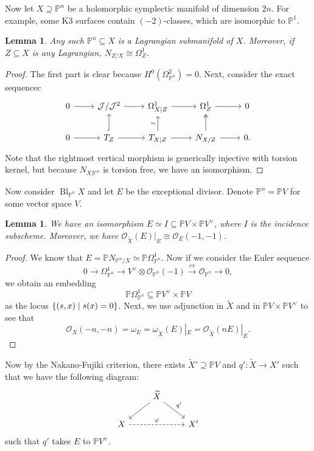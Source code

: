 \documentclass[leqno, openany]{memoir}
\newtheorem{lem}[thm]{Lemma}
\theoremstyle{definition}
\theoremstyle{remark}
\theoremstyle{plain}
\theoremstyle{definition}
\theoremstyle{remark}
\renewcommand{\P}{\mathbb{P}}
\newcommand{\mc}[1]{\mathcal{#1}}
\newcommand{\wt}[1]{\widetilde{#1}}
\DeclareMathOperator{\Bl}{Bl}
\begin{document}
Now let $X \supseteq \P^n$ be a holomorphic symplectic manifold of dimension $2n$. For example, some K3 surfaces contain $(-2)$-classes, which are isomorphic to $\P^1$.

\begin{lem}
    Any such $\P^n \subseteq X$ is a Lagrangian submanifold of $X$. Moreover, if $Z \subseteq X$ is any Lagrangian, $N_{Z/X} \cong \Omega^1_{Z}$.
\end{lem}

\begin{proof}
    The first part is clear because $H^0(\Omega^2_{\P^n}) = 0$. Next, consider the exact sequencec
    \begin{equation*}
    \begin{tikzcd}
        0 \ar{r} & \mc{J}/\mc{J}^2 \ar{r} & \Omega^1_{X|Z} \ar{r} & \Omega^1_{Z} \ar{r} & 0 \\
        0 \ar{r} & T_{Z} \ar{r} \ar[hookrightarrow]{u} & T_{X|Z} \ar{u}{\sim} \ar{r} & N_{X/Z} \ar{r} \ar[twoheadrightarrow]{u} & 0.
    \end{tikzcd}
    \end{equation*}
    Note that the rightmost vertical morphism is generically injective with torsion kernel, but because $N_{X|\P^n}$ is torsion free, we have an isomorphism.
\end{proof}

Now consider $\Bl_{\P^n} X$ and let $E$ be the exceptional divisor. Denote $\P^n = \P V$ for some vector space $V$.

\begin{lem}
    We have an isomorphism $E \simeq I \subseteq \P V \times \P V^{\vee}$, where $I$ is the incidence subscheme. Moreover, we have $\mc{O}_{\wt{X}}(E) |_E \cong \mc{O}_E(-1, -1)$.
\end{lem}

\begin{proof}
    We know that $E = \P N_{\P^n/X} \simeq \P \Omega^1_{\P^n}$. Now if we consider the Euler sequence
    \[ 0 \to \Omega^1_{\P^n} \to V^{\vee} \otimes \mc{O}_{\P^n}(-1) \xrightarrow{ev} \mc{O}_{\P^n} \to 0, \]
    we obtain an embedding
    \[ \P \Omega^1_{\P^n} \subseteq \P V^{\vee} \times \P V \]
    as the locus $\qty{(s,x) \mid s(x) = 0}$. Next, we use adjunction in $\wt{X}$ and in $\P V \times \P V^{\vee}$ to see that
    \[ \mc{O}_X(-n, -n) = \omega_E = \omega_{\wt{X}}(E)|_E = \mc{O}_{\wt{X}}(nE)|_E. \]
\end{proof}

Now by the Nakano-Fujiki criterion, there exists $\wt{X}' \supseteq \P V$ and $q' \colon \wt{X} \to X'$ such that we have the following diagram:
\begin{equation*}
\begin{tikzcd}
    & \wt{X} \ar{dl} \ar{dr}{q'} \\
    X \ar[dashrightarrow]{rr}{\varphi} & & X'
\end{tikzcd}
\end{equation*}
such that $q'$ takes $E$ to $\P V^{\vee}$.
\end{document}
